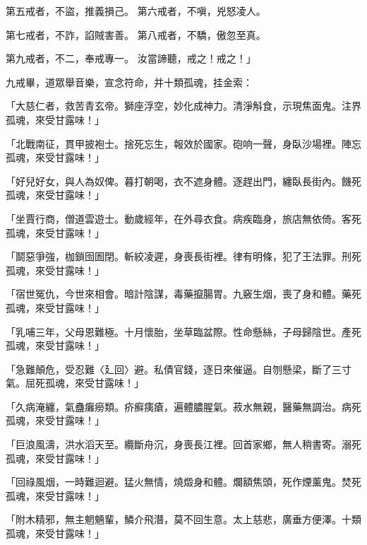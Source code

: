 \begin{showcontents}{}
第五戒者，不盜，推義損己。  第六戒者，不嗔，兇怒凌人。

第七戒者，不詐，諂賊害善。  第八戒者，不驕，傲忽至真。

第九戒者，不二，奉戒專一。  汝當諦聽，戒之！戒之！」

九戒畢，道眾舉音樂，宣念符命，并十類孤魂，挂金索：

「大慈仁者，救苦青玄帝。獅座浮空，妙化成神力。清淨斛食，示現焦面鬼。注界孤魂，來受甘露味！」

「北戰南征，貫甲披袍士。捨死忘生，報效於國家。砲响一聲，身臥沙場裡。陣忘孤魂，來受甘露味！」

「好兒好女，與人為奴俾。暮打朝喝，衣不遮身體。逐趕出門，纏臥長街內。饑死孤魂，來受甘露味！」

「坐賈行商，僧道雲遊士。動歲經年，在外尋衣食。病疾臨身，旅店無依倚。客死孤魂，來受甘露味！」

「鬬惡爭強，枷鎖囹圄閉。斬絞凌遲，身喪長街裡。律有明條，犯了王法罪。刑死孤魂，來受甘露味！」

「宿世冤仇，今世來相會。暗計陰謀，毒藥攛腸胃。九竅生烟，喪了身和體。藥死孤魂，來受甘露味！」

「乳哺三年，父母恩難極。十月懷胎，坐草臨盆際。性命懸絲，子母歸陰世。產死孤魂，來受甘露味！」

「急難顛危，受忍難〈廴回〉避。私債官錢，逐日來催逼。自刎懸梁，斷了三寸氣。屈死孤魂，來受甘露味！」

「久病淹纏，氣蠱癱癆類。疥癬痍瘡，遍體膿腥氣。菽水無親，醫藥無調治。病死孤魂，來受甘露味！」

「巨浪風濤，洪水滔天至。纜斷舟沉，身喪長江裡。回首家鄉，無人稍書寄。溺死孤魂，來受甘露味！」

「回祿風烟，一時難迴避。猛火無情，燒燬身和體。爛額焦頭，死作煙薰鬼。焚死孤魂，來受甘露味！」

「附木精邪，無主魍魎輩，鱗介飛潛，莫不回生意。太上慈悲，廣垂方便澤。十類孤魂，來受甘露味！」


\end{showcontents}
